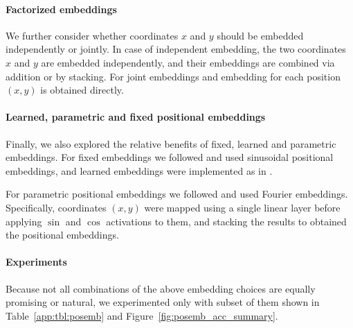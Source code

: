 \paragraph{Factorized embeddings}
We further consider whether coordinates $x$ and $y$ should be embedded independently or jointly. In case of independent embedding, the two coordinates $x$ and $y$ are embedded independently, and their embeddings are combined via addition or by stacking. For joint embeddings and embedding for each position $(x, y)$ is obtained directly.

\paragraph{Learned, parametric and fixed positional embeddings}
Finally, we also explored the relative benefits of fixed, learned and parametric embeddings. For fixed embeddings we followed \cite{vaswani2017attention} and used sinusoidal positional embeddings, and learned embeddings were implemented as in \cite{dosovitskiy2020image}.

For parametric positional embeddings we followed \cite{tancik2020fourier} and used Fourier embeddings. Specifically, coordinates $(x, y)$ were mapped using a single linear layer before applying $\sin$ and $\cos$ activations to them, and stacking the results to obtained the positional embeddings.

\paragraph{Experiments}
Because not all combinations of the above embedding choices are equally promising or natural, we experimented only with subset of them shown in Table~\ref{app:tbl:posemb} and Figure~\ref{fig:posemb_acc_summary}.

